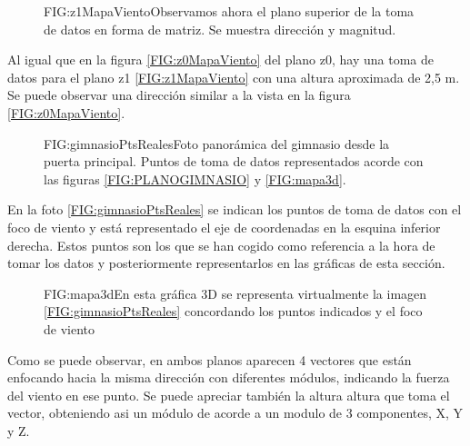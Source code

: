 \begin{figure}[Mapa viento 2D - Z1]{FIG:z1MapaViento}{Observamos ahora el plano superior de la toma de datos en forma de matriz. Se muestra dirección y magnitud.}
\end{figure}
Al igual que en la figura \ref{FIG:z0MapaViento} del plano z0, hay una toma de datos para el plano z1 \ref{FIG:z1MapaViento} con una altura aproximada de 2,5 m. Se puede observar una dirección similar a la vista en la figura \ref{FIG:z0MapaViento}.


\begin{figure}[Representación toma de puntos en gimnasio]{FIG:gimnasioPtsReales}{Foto panorámica del gimnasio desde la puerta principal. Puntos de toma de datos representados acorde con las figuras \ref{FIG:PLANOGIMNASIO} y \ref{FIG:mapa3d}.}
\end{figure}
En la foto \ref{FIG:gimnasioPtsReales} se indican los puntos de toma de datos con el foco de viento y está representado el eje de coordenadas en la esquina inferior derecha. Estos puntos son los que se han cogido como referencia a la hora de tomar los datos y posteriormente representarlos en las gráficas de esta sección.

\begin{figure}[Mapa de viento 3D]{FIG:mapa3d}{En esta gráfica 3D se representa virtualmente la imagen \ref{FIG:gimnasioPtsReales} concordando los puntos indicados y el foco de viento}
\end{figure}
Como se puede observar, en ambos planos aparecen 4 vectores que están enfocando hacia la misma dirección con diferentes módulos, indicando la fuerza del viento en ese punto. Se puede apreciar también la altura altura que toma el vector, obteniendo asi un módulo de acorde a un modulo de 3 componentes, X, Y y Z.